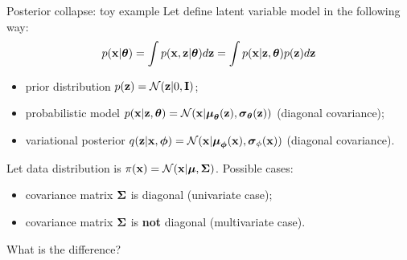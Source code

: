 \begin{frame}{Posterior collapse: toy example}
	Let define latent variable model in the following way:
	\[
		p(\mathbf{x} | \boldsymbol{\theta}) = \int p(\mathbf{x}, \mathbf{z} | \boldsymbol{\theta}) d \mathbf{z} = \int p(\mathbf{x} | \mathbf{z}, \boldsymbol{\theta}) p(\mathbf{z}) d \mathbf{z} 
	\]
	\begin{itemize}
		\item prior distribution $p(\mathbf{z}) = \mathcal{N}(\mathbf{z}| 0, \mathbf{I})$;
		\item probabilistic model $p(\mathbf{x} | \mathbf{z}, \boldsymbol{\theta}) = \mathcal{N}(\mathbf{x} | \boldsymbol{\mu}_{\boldsymbol{\theta}}(\mathbf{z}), \boldsymbol{\sigma}_{\boldsymbol{\theta}}(\mathbf{z}))$ (diagonal covariance);
		\item variational posterior $q(\mathbf{z} | \mathbf{x}, \boldsymbol{\phi}) =  \mathcal{N}(\mathbf{x} | \boldsymbol{\mu}_{\boldsymbol{\phi}}(\mathbf{x}), \boldsymbol{\sigma}_{\phi}(\mathbf{x}))$  (diagonal covariance).
	\end{itemize}
	
	Let data distribution is $\pi(\mathbf{x}) = \mathcal{N}(\mathbf{x} | \boldsymbol{\mu}, \boldsymbol{\Sigma})$. Possible cases:
	\begin{itemize}
		\item covariance matrix $\boldsymbol{\Sigma}$ is diagonal (univariate case);
		\item covariance matrix $\boldsymbol{\Sigma}$ is \textbf{not} diagonal (multivariate case).
	\end{itemize}
	What is the difference?
\end{frame}
